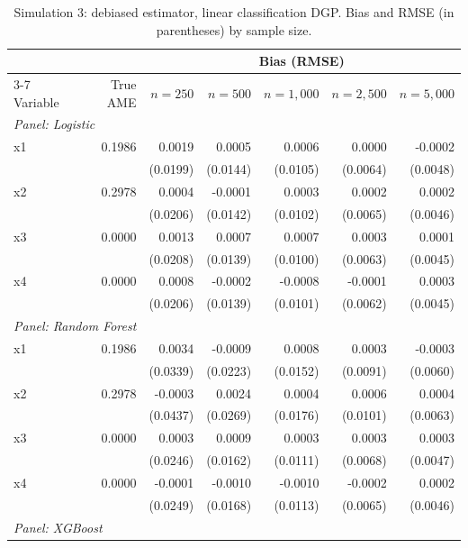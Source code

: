 \documentclass[12pt]{article}
\begin{document}
	\begin{table}[htbp]
		\centering
		\small
		\begin{threeparttable}
			\caption{Simulation 3: debiased estimator, linear classification DGP. Bias and RMSE (in parentheses) by sample size.}
			\label{tab:sim3_bias_classification_linear}
			\begin{tabular}{lrrrrrr}
				\toprule
				& & \multicolumn{5}{c}{Bias (RMSE)} \\
				\cmidrule(lr){3-7}
				Variable & True AME & $n=250$ & $n=500$ & $n=1,000$ & $n=2,500$ & $n=5,000$ \\
				\midrule
				\multicolumn{7}{l}{\textit{Panel: Logistic}} \\
				\quad x1 & 0.1986 & 0.0019 & 0.0005 & 0.0006 & 0.0000 & -0.0002 \\
				&  & (0.0199) & (0.0144) & (0.0105) & (0.0064) & (0.0048) \\
				\quad x2 & 0.2978 & 0.0004 & -0.0001 & 0.0003 & 0.0002 & 0.0002 \\
				&  & (0.0206) & (0.0142) & (0.0102) & (0.0065) & (0.0046) \\
				\quad x3 & 0.0000 & 0.0013 & 0.0007 & 0.0007 & 0.0003 & 0.0001 \\
				&  & (0.0208) & (0.0139) & (0.0100) & (0.0063) & (0.0045) \\
				\quad x4 & 0.0000 & 0.0008 & -0.0002 & -0.0008 & -0.0001 & 0.0003 \\
				&  & (0.0206) & (0.0139) & (0.0101) & (0.0062) & (0.0045) \\
				\midrule
				\multicolumn{7}{l}{\textit{Panel: Random Forest}} \\
				\quad x1 & 0.1986 & 0.0034 & -0.0009 & 0.0008 & 0.0003 & -0.0003 \\
				&  & (0.0339) & (0.0223) & (0.0152) & (0.0091) & (0.0060) \\
				\quad x2 & 0.2978 & -0.0003 & 0.0024 & 0.0004 & 0.0006 & 0.0004 \\
				&  & (0.0437) & (0.0269) & (0.0176) & (0.0101) & (0.0063) \\
				\quad x3 & 0.0000 & 0.0003 & 0.0009 & 0.0003 & 0.0003 & 0.0003 \\
				&  & (0.0246) & (0.0162) & (0.0111) & (0.0068) & (0.0047) \\
				\quad x4 & 0.0000 & -0.0001 & -0.0010 & -0.0010 & -0.0002 & 0.0002 \\
				&  & (0.0249) & (0.0168) & (0.0113) & (0.0065) & (0.0046) \\
				\midrule
				\multicolumn{7}{l}{\textit{Panel: XGBoost}} \\

\end{tabular}
\end{threeparttable}
\end{table}
\end{document}
